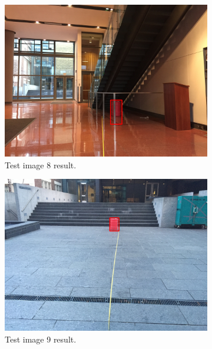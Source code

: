 \documentclass[a4paper]{article}
\begin{document}
\begin{figure}[!tbp]
  \centering
  \begin{subfigure}[b]{.4\textwidth}
    \includegraphics[width=1\textwidth]{test_image8.png}
\caption{\label{fig:test8}Test image 8 result.}
  \end{subfigure}
  \begin{subfigure}[b]{.4\textwidth}
    \includegraphics[width=1\textwidth]{test_image9.png}
\caption{\label{fig:test9}Test image 9 result.}
  \end{subfigure}
  \caption{\label{fig:test5_set}}
\end{figure}
\end{document}
